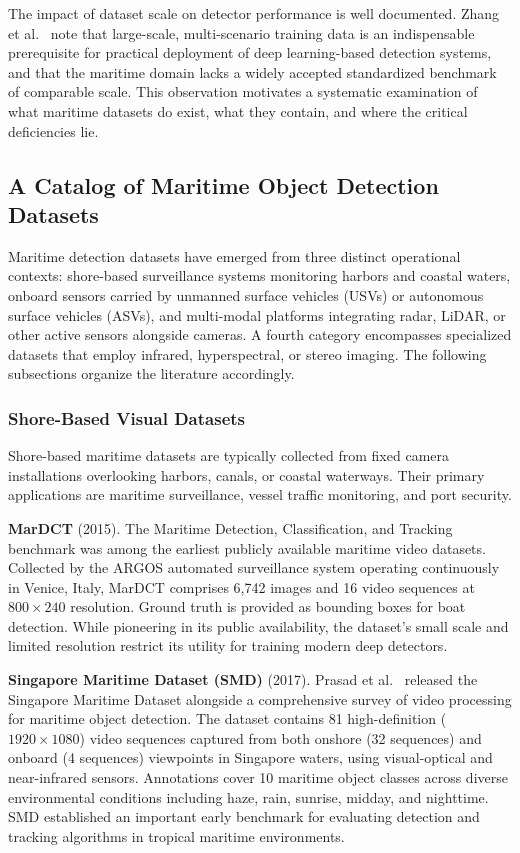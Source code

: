 The impact of dataset scale on detector performance is well documented. Zhang et
al.~\cite{Zhang2021MarineDetectionSurvey} note that large-scale, multi-scenario training
data is an indispensable prerequisite for practical deployment of deep learning-based
detection systems, and that the maritime domain lacks a widely accepted standardized
benchmark of comparable scale. This observation motivates a systematic examination of
what maritime datasets do exist, what they contain, and where the critical deficiencies lie.

\subsection{A Catalog of Maritime Object Detection Datasets}
\label{subsec:dataset_catalog}

Maritime detection datasets have emerged from three distinct operational contexts:
shore-based surveillance systems monitoring harbors and coastal waters, onboard sensors
carried by unmanned surface vehicles (USVs) or autonomous surface vehicles (ASVs), and
multi-modal platforms integrating radar, LiDAR, or other active sensors alongside cameras.
A fourth category encompasses specialized datasets that employ infrared, hyperspectral,
or stereo imaging. The following subsections organize the literature accordingly.

\subsubsection{Shore-Based Visual Datasets}
\label{subsubsec:shore_based}

Shore-based maritime datasets are typically collected from fixed camera installations
overlooking harbors, canals, or coastal waterways. Their primary applications are
maritime surveillance, vessel traffic monitoring, and port security.

\textbf{MarDCT} (2015). The Maritime Detection, Classification, and Tracking benchmark
\cite{Bloisi2015MarDCT} was among the earliest publicly available maritime video datasets.
Collected by the ARGOS automated surveillance system operating continuously in Venice,
Italy, MarDCT comprises 6,742 images and 16 video sequences at $800 \times 240$
resolution. Ground truth is provided as bounding boxes for boat detection. While
pioneering in its public availability, the dataset's small scale and limited resolution
restrict its utility for training modern deep detectors.

\textbf{Singapore Maritime Dataset (SMD)} (2017). Prasad et al.~\cite{Prasad2017SMD}
released the Singapore Maritime Dataset alongside a comprehensive survey of video
processing for maritime object detection. The dataset contains 81 high-definition
($1920 \times 1080$) video sequences captured from both onshore (32 sequences) and
onboard (4 sequences) viewpoints in Singapore waters, using visual-optical and
near-infrared sensors. Annotations cover 10 maritime object classes across diverse
environmental conditions including haze, rain, sunrise, midday, and nighttime. SMD
established an important early benchmark for evaluating detection and tracking algorithms
in tropical maritime environments.


